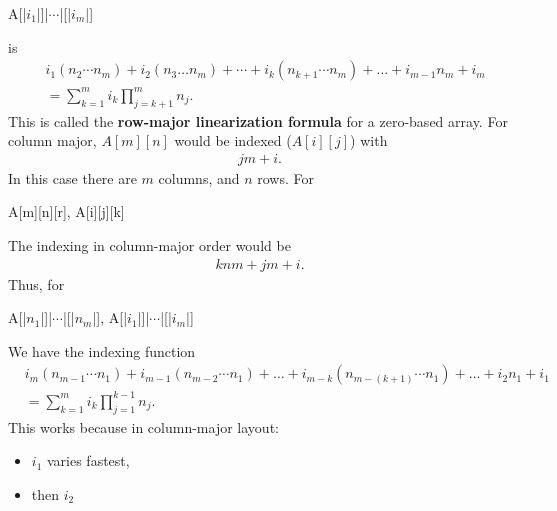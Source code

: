 \documentclass{report}
\begin{document}
\begin{itemize}
                 \begin{cppcode}
                     A[|$i_{1}$|]|$\cdots$|[|$i_{m}$|]
                 \end{cppcode}
                 \bigbreak \noindent 
                 is
                 \begin{align*}
                     &i_{1}(n_{2}\cdots n_{m}) + i_{2}(n_{3} \ldots n_{m}) + \cdots + i_{k}(n_{k+1}\cdots n_{m}) + \ldots + i_{m-1}n_{m} + i_{m} \\
                     &=\sum_{k=1}^{m}i_{k}\prod_{j=k+1}^{m}n_{j}
                 .\end{align*}
                 This is called the \textbf{row-major linearization formula} for a zero-based array.
                 \bigbreak \noindent 
                 For column major, $A[m][n]$ would be indexed ($A[i][j]$) with
                 \begin{align*}
                     jm + i
                 .\end{align*}
                 In this case there are $m$ columns, and $n$ rows. For 
                 \bigbreak \noindent 
                 \begin{cppcode}
                     A[m][n][r], A[i][j][k]
                 \end{cppcode}
                 \bigbreak \noindent 
                 The indexing in column-major order would be
                 \begin{align*}
                     knm  + jm + i
                 .\end{align*}
                 Thus, for
                 \begin{cppcode}
                     A[|$n_{1}$|]|$\cdots$|[|$n_{m}$|], A[|$i_{1}$|]|$\cdots$|[|$i_{m}$|]
                 \end{cppcode}
                 \bigbreak \noindent 
                 We have the indexing function
                 \begin{align*}
                     &i_{m}(n_{m-1}\cdots n_{1}) + i_{m-1}(n_{m-2}\cdots n_{1}) + \ldots + i_{m-k}(n_{m-(k+1)}\cdots n_{1}) + \ldots + i_{2}n_{1} + i_{1} \\
                     &=\sum_{k=1}^{m}i_{k}\prod_{j=1}^{k-1}n_{j}
                 .\end{align*}
                 This works because in column-major layout:
                 \begin{itemize}
                     \item $i_{1}$ varies fastest,
                     \item then $i_{2} $ 

\end{itemize}
\end{itemize}
\end{document}
